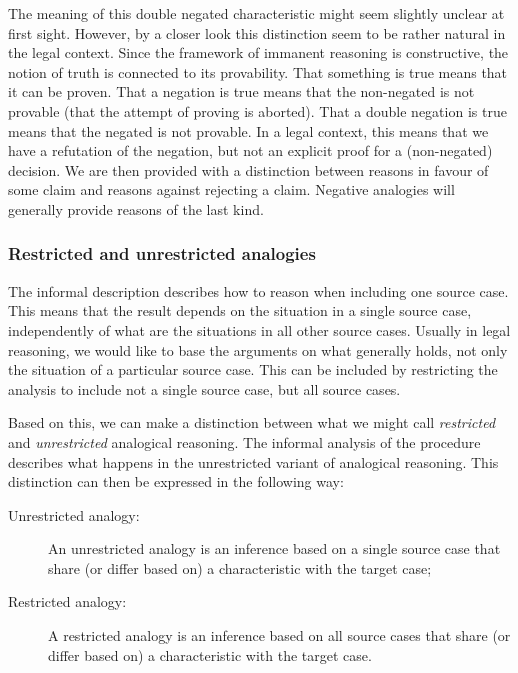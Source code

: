 		 The meaning of this double negated characteristic might seem slightly unclear at first sight. However, by a closer look this distinction seem to be rather natural in the legal context. Since the framework of immanent reasoning is constructive, the notion of truth is connected to its provability. That something is true means that it can be proven. That a negation is true means that the non-negated is not provable (that the attempt of proving is aborted). That a double negation is true means that the negated is not provable. In a legal context, this means that we have a refutation of the negation, but not an explicit proof for a (non-negated) decision. We are then provided with a distinction between reasons in favour of some claim and reasons against rejecting a claim. Negative analogies will generally provide reasons of the last kind. 
		 
		 \subsubsection{Restricted and unrestricted analogies}
		 
		 The informal description describes how to reason when including one source case. This means that the result depends on the situation in a single source case, independently of what are the situations in all other source cases. Usually in legal reasoning, we would like to base the arguments on what generally holds, not only the situation of a particular source case. This can be included by restricting the analysis to include not a single source case, but all source cases.
		 
		 Based on this, we can make a distinction between what we might call \textit{restricted} and \textit{unrestricted} analogical reasoning. The informal analysis of the procedure describes what happens in the unrestricted variant of analogical reasoning. This distinction can then be expressed in the following way:
		 \begin{description}
		 	\item[Unrestricted analogy:] An unrestricted analogy is an inference based on a single source case that share (or differ based on) a characteristic with the target case;
		 	\item[Restricted analogy:] A restricted analogy is an inference based on all source cases that share (or differ based on) a characteristic with the target case.
		 \end{description}
		 
